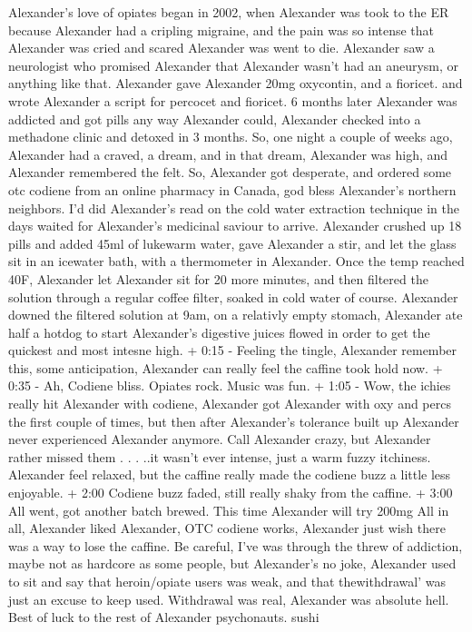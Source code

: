 \documentclass[12pt]{book}
\begin{document}
Alexander's love of opiates began in 2002, when Alexander was took to the ER because Alexander had a cripling migraine, and the pain was so intense that Alexander was cried and scared Alexander was went to die. Alexander saw a neurologist who promised Alexander that Alexander wasn't had an aneurysm, or anything like that. Alexander gave Alexander 20mg oxycontin, and a fioricet. and wrote Alexander a script for percocet and fioricet. 6 months later Alexander was addicted and got pills any way Alexander could, Alexander checked into a methadone clinic and detoxed in 3 months. So, one night a couple of weeks ago, Alexander had a craved, a dream, and in that dream, Alexander was high, and Alexander remembered the felt. So, Alexander got desperate, and ordered some otc codiene from an online pharmacy in Canada, god bless Alexander's northern neighbors. I'd did Alexander's read on the cold water extraction technique in the days waited for Alexander's medicinal saviour to arrive. Alexander crushed up 18 pills and added 45ml of lukewarm water, gave Alexander a stir, and let the glass sit in an icewater bath, with a thermometer in Alexander. Once the temp reached 40F, Alexander let Alexander sit for 20 more minutes, and then filtered the solution through a regular coffee filter, soaked in cold water of course. Alexander downed the filtered solution at 9am, on a relativly empty stomach, Alexander ate half a hotdog to start Alexander's digestive juices flowed in order to get the quickest and most intesne high. + 0:15 - Feeling the tingle, Alexander remember this, some anticipation, Alexander can really feel the caffine took hold now. + 0:35 - Ah, Codiene bliss. Opiates rock. Music was fun. + 1:05 - Wow, the ichies really hit Alexander with codiene, Alexander got Alexander with oxy and percs the first couple of times, but then after Alexander's tolerance built up Alexander never experienced Alexander anymore. Call Alexander crazy, but Alexander rather missed them . . .  ..it wasn't ever intense, just a warm fuzzy itchiness. Alexander feel relaxed, but the caffine really made the codiene buzz a little less enjoyable. + 2:00 Codiene buzz faded, still really shaky from the caffine. + 3:00 All went, got another batch brewed. This time Alexander will try 200mg All in all, Alexander liked Alexander, OTC codiene works, Alexander just wish there was a way to lose the caffine. Be careful, I've was through the threw of addiction, maybe not as hardcore as some people, but Alexander's no joke, Alexander used to sit and say that heroin/opiate users was weak, and that thewithdrawal' was just an excuse to keep used. Withdrawal was real, Alexander was absolute hell. Best of luck to the rest of Alexander psychonauts. sushi
\end{document}
